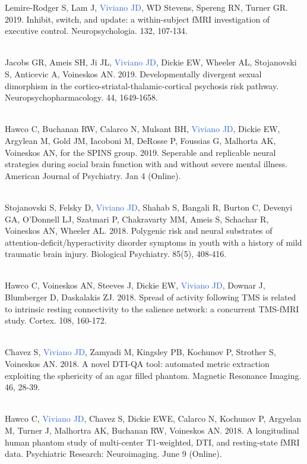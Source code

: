 \documentclass[a4paper,11pt,oneside]{book}
\begin{document}
\begin{flushleft}
Lemire-Rodger S, Lam J, \textcolor{highlight}{Viviano JD}, WD Stevens, Spereng RN, Turner GR. 2019. Inhibit, switch, and update: a within-subject fMRI investigation of executive control. Neuropsychologia. 132, 107-134. \\\

Jacobs GR, Ameis SH, Ji JL, \textcolor{highlight}{Viviano JD}, Dickie EW, Wheeler AL, Stojanovski S, Anticevic A, Voineskos AN. 2019. Developmentally divergent sexual dimorphism in the cortico-striatal-thalamic-cortical psychosis risk pathway. Neuropsychopharmacology. 44, 1649-1658. \\\

Hawco C, Buchanan RW, Calarco N, Mulsant BH, \textcolor{highlight}{Viviano JD}, Dickie EW, Argylean M, Gold JM, Iacoboni M, DeRosse P, Foussias G, Malhorta AK, Voineskos AN, for the SPINS group. 2019. Seperable and replicable neural strategies during social brain function with and without severe mental illness. American Journal of Psychiatry. Jan 4 (Online). \\\

Stojanovski S, Felsky D, \textcolor{highlight}{Viviano JD}, Shahab S, Bangali R, Burton C, Devenyi GA, O'Donnell LJ, Szatmari P, Chakravarty MM, Ameis S, Schachar R, Voineskos AN, Wheeler AL. 2018. Polygenic risk and neural substrates of attention-deficit/hyperactivity disorder symptoms in youth with a history of mild traumatic brain injury. Biological Psychiatry. 85(5), 408-416. \\\

Hawco C, Voineskos AN,  Steeves J, Dickie EW, \textcolor{highlight}{Viviano JD}, Downar J, Blumberger D, Daskalakis ZJ. 2018. Spread of activity following TMS is related to intrinsic resting connectivity to the salience network: a concurrent TMS-fMRI study. Cortex. 108, 160-172. \\\

Chavez S, \textcolor{highlight}{Viviano JD}, Zamyadi M, Kingsley PB, Kochunov P, Strother S, Voineskos AN. 2018. A novel DTI-QA tool: automated metric extraction exploiting the sphericity of an agar filled phantom. Magnetic Resonance Imaging. 46, 28-39. \\\

Hawco C, \textcolor{highlight}{Viviano JD}, Chavez S, Dickie EWE, Calarco N, Kochunov P, Argyelan M, Turner J, Malhortra AK, Buchanan RW, Voineskos AN. 2018. A longitudinal human phantom study of multi-center T1-weighted, DTI, and resting-state fMRI data. Psychiatric Research: Neuroimaging. June 9 (Online).  \\\


\end{flushleft}
\end{document}
